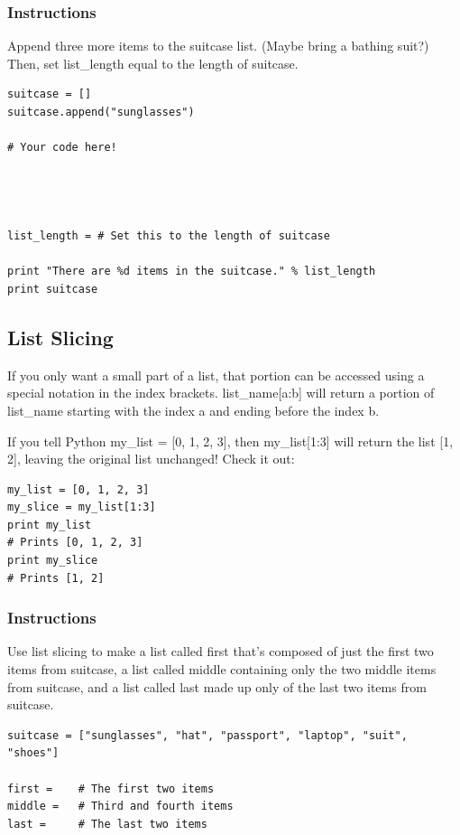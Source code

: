 \documentclass[12pt,a4paper,final,twoside,onecolumn,titlepage]{book}
\begin{document}
\subsubsection{Instructions}

Append three more items to the suitcase list. (Maybe bring a bathing suit?) Then, set list\_length equal to the length of suitcase.

\begin{lstlisting}
suitcase = [] 
suitcase.append("sunglasses")

# Your code here!




list_length = # Set this to the length of suitcase

print "There are %d items in the suitcase." % list_length
print suitcase
\end{lstlisting}

\subsection{List Slicing}

If you only want a small part of a list, that portion can be accessed using a special notation in the index brackets. list\_name[a:b] will return a portion of list\_name starting with the index a and ending before the index b.

If you tell Python my\_list = [0, 1, 2, 3], then my\_list[1:3] will return the list [1, 2], leaving the original list unchanged! Check it out:
\begin{lstlisting}
my_list = [0, 1, 2, 3]
my_slice = my_list[1:3]
print my_list
# Prints [0, 1, 2, 3]
print my_slice
# Prints [1, 2]
\end{lstlisting}

\subsubsection{Instructions}

Use list slicing to make a list called first that's composed of just the first two items from suitcase, a list called middle containing only the two middle items from suitcase, and a list called last made up only of the last two items from suitcase.

\begin{lstlisting}
suitcase = ["sunglasses", "hat", "passport", "laptop", "suit", "shoes"]

first =    # The first two items
middle =   # Third and fourth items
last =     # The last two items
\end{lstlisting}
\end{document}
